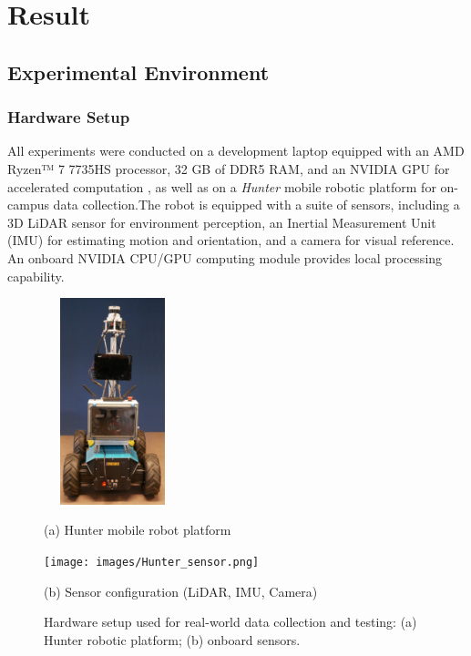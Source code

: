 \chapter{Result}
\label{ch:intro}

\section{Experimental Environment}

\subsection{Hardware Setup}
All experiments were conducted on a development laptop equipped with an AMD Ryzen™ 7 7735HS processor, 32 GB of DDR5 RAM, and an NVIDIA GPU for accelerated computation , as well as on a \emph{Hunter} mobile robotic platform for on-campus data collection.The robot is equipped with a suite of sensors, including a 3D LiDAR sensor for environment perception, an Inertial Measurement Unit (IMU) for estimating motion and orientation, and a camera for visual reference. An onboard NVIDIA CPU/GPU computing module provides local processing capability.

\begin{figure}[H]
	\centering
	\begin{minipage}{0.5\textwidth}
		\centering
		\includegraphics[height=6cm , width=4cm]{images/Hunter_body.png}
		\caption*{(a) Hunter mobile robot platform}
	\end{minipage}\hfill
	\begin{minipage}{0.5\textwidth}
		\centering
		\texttt{[image: images/Hunter\_sensor.png]}
		\caption*{(b) Sensor configuration (LiDAR, IMU, Camera)}
	\end{minipage}
	\caption{Hardware setup used for real-world data collection and testing: (a) Hunter robotic platform; (b) onboard sensors.}
	\label{fig:hunter-robot-setup}
\end{figure}



